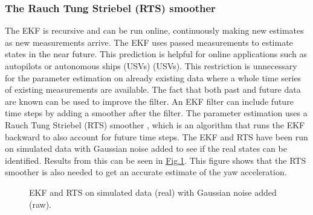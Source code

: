 \documentclass[review]{elsarticle}
\begin{document}
\subsubsection{The Rauch Tung Striebel (RTS) smoother}
\label{\detokenize{04.01_EK:the-rauch-tung-striebel-rts-smoother}}\label{\detokenize{04.01_EK:rts}}
\sphinxAtStartPar
The EKF is recursive and can be run online, continuously making new estimates as new measurements arrive. The EKF uses passed measurements to estimate states in the near future. This prediction is helpful for online applications such as  autopilots or autonomous ships (USVs) (USVs). This restriction is  unnecessary for the parameter estimation on already existing data where a whole time series of existing measurements are available. The fact that both past and future data are known can be used to improve the filter. An EKF filter can include future time steps by adding a smoother after the filter. The parameter estimation uses a Rauch Tung Striebel (RTS) smoother \cite{rauch_maximum_1965}, which is an algorithm that runs the EKF backward to also account for future time steps.
The EKF and RTS have been run on simulated data with Gaussian noise added to see if the real states can be identified. Results from this can be seen in  \hyperref[\detokenize{04.01_EK:fig-ekf}]{Fig.\@ \ref{\detokenize{04.01_EK:fig-ekf}}}. This figure shows that the RTS smoother is also needed to get an accurate estimate of the yaw acceleration.

\begin{figure}[H]
\centering
\capstart

\noindent{}
\caption{EKF and RTS on simulated data (real) with Gaussian noise added (raw).}\label{\detokenize{04.01_EK:fig-ekf}}\end{figure}
\end{document}
